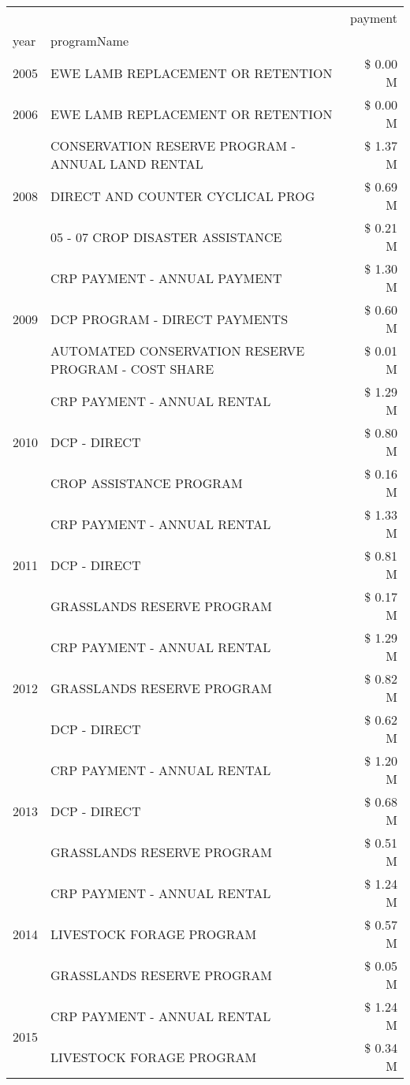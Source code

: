 \begin{tabular}{llr}
\toprule
 &  & payment \\
year & programName &  \\
\midrule
2005 & EWE LAMB REPLACEMENT OR RETENTION & \$ 0.00 M \\
\cline{1-3}
2006 & EWE LAMB REPLACEMENT OR RETENTION & \$ 0.00 M \\
\cline{1-3}
\multirow[t]{3}{*}{2008} & CONSERVATION RESERVE PROGRAM - ANNUAL LAND RENTAL & \$ 1.37 M \\
 & DIRECT AND COUNTER CYCLICAL PROG & \$ 0.69 M \\
 & 05 - 07 CROP DISASTER ASSISTANCE & \$ 0.21 M \\
\cline{1-3}
\multirow[t]{3}{*}{2009} & CRP PAYMENT - ANNUAL PAYMENT & \$ 1.30 M \\
 & DCP PROGRAM - DIRECT PAYMENTS & \$ 0.60 M \\
 & AUTOMATED CONSERVATION RESERVE PROGRAM - COST SHARE & \$ 0.01 M \\
\cline{1-3}
\multirow[t]{3}{*}{2010} & CRP PAYMENT - ANNUAL RENTAL & \$ 1.29 M \\
 & DCP - DIRECT & \$ 0.80 M \\
 & CROP ASSISTANCE PROGRAM & \$ 0.16 M \\
\cline{1-3}
\multirow[t]{3}{*}{2011} & CRP PAYMENT - ANNUAL RENTAL & \$ 1.33 M \\
 & DCP - DIRECT & \$ 0.81 M \\
 & GRASSLANDS RESERVE PROGRAM & \$ 0.17 M \\
\cline{1-3}
\multirow[t]{3}{*}{2012} & CRP PAYMENT - ANNUAL RENTAL & \$ 1.29 M \\
 & GRASSLANDS RESERVE PROGRAM & \$ 0.82 M \\
 & DCP - DIRECT & \$ 0.62 M \\
\cline{1-3}
\multirow[t]{3}{*}{2013} & CRP PAYMENT - ANNUAL RENTAL & \$ 1.20 M \\
 & DCP - DIRECT & \$ 0.68 M \\
 & GRASSLANDS RESERVE PROGRAM & \$ 0.51 M \\
\cline{1-3}
\multirow[t]{3}{*}{2014} & CRP PAYMENT - ANNUAL RENTAL & \$ 1.24 M \\
 & LIVESTOCK FORAGE PROGRAM & \$ 0.57 M \\
 & GRASSLANDS RESERVE PROGRAM & \$ 0.05 M \\
\cline{1-3}
\multirow[t]{3}{*}{2015} & CRP PAYMENT - ANNUAL RENTAL & \$ 1.24 M \\
 & LIVESTOCK FORAGE PROGRAM & \$ 0.34 M \\

\end{tabular}
